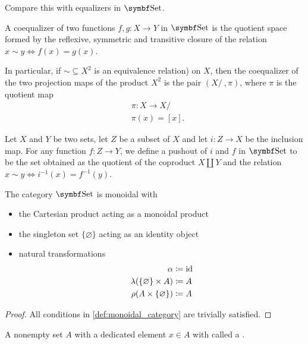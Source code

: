 \begin{proposition}
\begin{defenum}
    Compare this with equalizers in \( \Cat{Set} \).

     A coequalizer of two functions \( f, g: X \to Y \) in \( \Cat{Set} \) is the quotient space formed by the reflexive, symmetric and transitive closure of the relation \( x \sim y \iff f(x) = g(x) \).

    In particular, if \( \sim \subseteq X^2 \) is an equivalence relation) on \( X \), then the coequalizer of the two projection maps of the product \( X^2 \) is the pair \( (X / ~, \pi) \), where \( \pi \) is the quotient map
    \begin{align*}
      &\pi: X \to X / ~ \\
      &\pi(x) = [x].
    \end{align*}

     Let \( X \) and \( Y \) be two sets, let \( Z \) be a subset of \( X \) and let \( i: Z \to X \) be the inclusion map. For any function \( f: Z \to Y \), we define a pushout of \( i \) and \( f \) in \( \Cat{Set} \) to be the set obtained as the quotient of the coproduct \( X \coprod Y \) and the relation \( x \sim y \iff i^{-1}(x) = f^{-1}(y) \).
  \end{defenum}
\end{proposition}

\begin{proposition}\label{thm:set_is_monoidal}
  The category \( \Cat{Set} \) is monoidal with
  \begin{itemize}
    \item the Cartesian product acting as a monoidal product
    \item the singleton set \( \{ \varnothing \} \) acting as an identity object
    \item natural transformations
    \begin{align*}
      \alpha &\coloneqq \operatorname{id} \\
      \lambda(\{ \varnothing \} \times A) &\coloneqq A \\
      \rho(A \times \{ \varnothing \}) &\coloneqq A
    \end{align*}
  \end{itemize}
\end{proposition}
\begin{proof}
  All conditions in \cref{def:monoidal_category} are trivially satisfied.
\end{proof}

\begin{definition}\label{def:pointed_set}
  A nonempty set \( A \) with a dedicated element \( x \in A \) with called a .
\end{definition}
